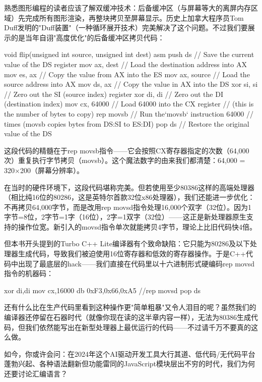 熟悉图形编程的读者应该了解双缓冲技术：后备缓冲区（与屏幕等大的离屏内存区域）先完成所有图形渲染，再整块拷贝至屏幕显示。历史上加拿大程序员Tom Duff发明的"Duff装置"（一种循环展开技术）完美解决了这个问题。不过我们要展示的是当年自诩"高度优化"的后备缓冲区拷贝代码：

\begin{cpp}
void flip(unsigned int source, unsigned int dest) {
asm {
    push ds // Save the current value of the DS register
    mov ax, dest // Load the destination address into AX
    mov es, ax // Copy the value from AX into the ES
    mov ax, source // Load the source address into AX
    mov ds, ax // Copy the value in AX into the DS
    xor si, si // Zero out the SI (source index) register
    xor di, di // Zero out the DI (destination index)
    mov cx, 64000 // Load 64000 into the CX register
    // (this is the number of bytes to copy)
    rep movsb // Run the`movsb` instruction 64000
    // times (movsb copies bytes from DS:SI to ES:DI)
    pop ds // Restore the original value of the DS
  } 
}
\end{cpp}

这段代码的精髓在于rep movsb指令——它会按照CX寄存器指定的次数（64,000次）重复执行字节拷贝（movsb）。这个魔法数字的由来我们都清楚：64,000 = 320×200（屏幕分辨率）。

在当时的硬件环境下，这段代码堪称完美。但若使用至少80386这样的高端处理器（相比纯16位的80286，这是英特尔首款32位x86处理器），我们还能进一步优化：不再拷贝64,000字节，而是改用rep movsd指令处理16,000个双字（32位）。因为1字节=8位，2字节=1字（16位），2字=1双字（32位）——这正是新处理器原生支持的操作位宽。新引入的movsd指令单次就能拷贝4字节，理论上比旧代码快4倍。

但本书开头提到的Turbo C++ Lite编译器有个致命缺陷：它只能为80286及以下处理器生成代码，导致我们被迫使用16位寄存器和低效的寄存器操作。于是C++代码中出现了最底层的hack——我们直接在代码里以十六进制形式硬编码rep movsd指令的机器码：

\begin{shell}
xor di,di
mov cx,16000
db 0xF3,0x66,0xA5 //rep movsd
pop ds
\end{shell}

还有什么比在生产代码里看到这种操作更"简单粗暴"又令人泪目的呢？虽然我们的编译器还停留在石器时代（就像你现在读的这半章内容一样），无法为80386生成代码，但我们依然能写出在新型处理器上最优运行的代码——不过请千万不要真的这么做。


如今，你或许会问：在2024年这个AI驱动开发工具大行其道、低代码/无代码平台蓬勃兴起、各种语法翻新但功能雷同的JavaScript模块层出不穷的时代，我们为何还要讨论汇编语言？

